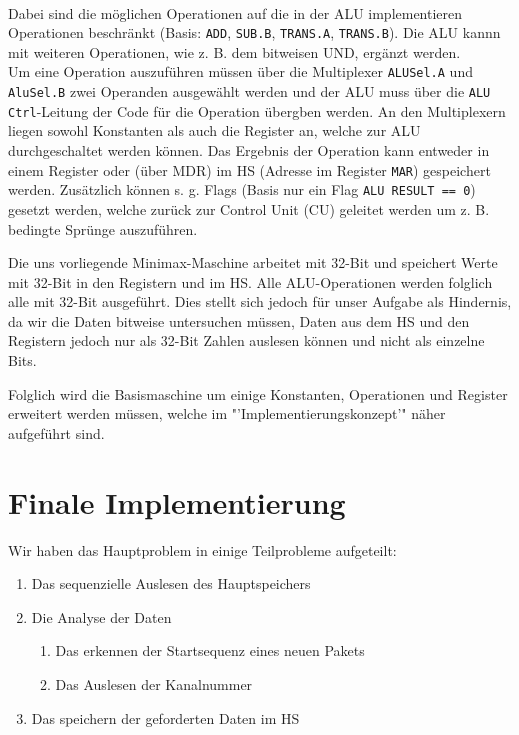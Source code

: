 \documentclass[12pt,titlepage]{article}
\begin{document}
\leavevmode \\

Dabei sind die m{\"o}glichen Operationen auf die in der ALU implementieren
Operationen beschr{\"a}nkt (Basis: \texttt{ADD}, \texttt{SUB.B}, \texttt{TRANS.A}, \texttt{TRANS.B}). Die ALU kannn mit weiteren Operationen,
wie z. B. dem bitweisen UND, erg{\"a}nzt werden.\\
Um eine Operation auszuf{\"u}hren m{\"u}ssen {\"u}ber die Multiplexer \texttt{ALUSel.A} und \texttt{AluSel.B} zwei Operanden ausgew{\"a}hlt werden
und der ALU muss {\"u}ber die \texttt{ALU Ctrl}-Leitung der Code f{\"u}r die Operation {\"u}bergben werden. An den Multiplexern liegen sowohl
Konstanten als auch die Register an, welche zur ALU durchgeschaltet werden k{\"o}nnen. Das Ergebnis der Operation kann
entweder in einem Register oder (über MDR) im HS (Adresse im Register \texttt{MAR}) gespeichert werden. Zus{\"a}tzlich k{\"o}nnen s. g. Flags (Basis nur ein Flag \texttt{ALU RESULT == 0})
gesetzt werden, welche zur{\"u}ck zur Control Unit (CU) geleitet werden um z. B. bedingte Spr{\"u}nge auszuf{\"u}hren.


Die uns vorliegende Minimax-Maschine arbeitet mit 32-Bit und speichert Werte mit 32-Bit in den Registern und im HS.
Alle ALU-Operationen werden folglich alle mit 32-Bit ausgef{\"u}hrt. Dies stellt sich jedoch f{\"u}r unser Aufgabe als
Hindernis, da wir die Daten bitweise untersuchen m{\"u}ssen, Daten aus dem HS und den Registern jedoch nur als
32-Bit Zahlen auslesen k{\"o}nnen und nicht als einzelne Bits.

Folglich wird die Basismaschine um einige Konstanten, Operationen und Register erweitert werden müssen, welche im "'Implementierungskonzept'" n{\"a}her
aufgeführt sind.

\newpage

\section{Finale Implementierung}
Wir haben das Hauptproblem in einige Teilprobleme aufgeteilt:
\begin{enumerate}
\item Das sequenzielle Auslesen des Hauptspeichers
\item Die Analyse der Daten
    \begin{enumerate}
    \item Das erkennen der Startsequenz eines neuen Pakets
    \item Das Auslesen der Kanalnummer
    \end{enumerate}
\item Das speichern der geforderten Daten im HS
\end{enumerate}
\end{document}
